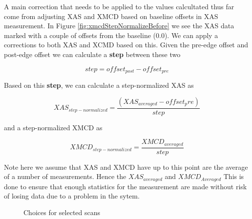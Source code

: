 \documentclass[12pt,letterpaper, openany]{book}
\begin{document}
A main correction that needs to be applied to the values calcultated thus far
come from adjusting XAS and XMCD based on baseline offsets in XAS measurement.
In Figure \ref{fig:xmcdStepNormalizeBefore} we see the XAS data marked with a
couple of offsets from the baseline (0.0).  We can apply a corrections to both
XAS and XCMD based on this.  Given the pre-edge offset and post-edge offset we
can calculate a \textbf{step} between these two 

\begin{equation}
step = offset_{post} - offset_{pre}
\label{eq:stepNormalizeStep}
\end{equation}

Based on this \textbf{step}, we can calculate a step-normalized XAS as

\begin{equation}
XAS_{step-normalized} = \frac{(XAS_{averaged} - offset_pre)}{step}
\label{eq:stepNormalizeXAS}
\end{equation}

and a step-normalized XMCD as
 
\begin{equation}
XMCD_{step-normalized} = \frac{XMCD_{averaged}}{step}
\label{eq:stepNormalizeXMCD}
\end{equation}

Note here we assume that XAS and XMCD have up to this point are the average of a
number of measurements.  Hence the $XAS_{averaged}$ and $XMCD_{Averaged}$ This
is done to ensure that enough statistics for the measurement are made without
risk of losing data due to a problem in the sytem.

\begin{figure}[htp]

\centering
{}


\caption {Choices for selected scans}
\label{fig:pointSelectionControl}
\end{figure}
\end{document}
